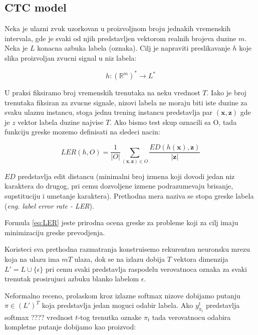 \documentclass[a4paper]{article}
\begin{document}

\subsection{CTC model}

Neka je ulazni zvuk uzorkovan u proizvoljnom broju jednakih vremenskih intervala,  gde je svaki od njih predstavljen vektorom realnih brojeva duzine $m$.  Neka je $L$ konacna azbuka labela (oznaka).  Cilj je napraviti preslikavanje $h$ koje slika proizvoljan zvucni signal u niz labela:

\begin{equation}
\label{eq:pres1}
h: (\mathbb{R}^m)^* \rightarrow L^* 
\end{equation}


U praksi fiksiramo broj vremenskih trenutaka na neku vrednost $T$.  Iako je broj trenutaka fiksiran za zvucne signale,  nizovi labela ne moraju biti iste duzine za svaku ulaznu instancu, stoga jednu trening instancu predstavlja par $(\textbf{x}, \textbf{z})$ gde je $z$ vektor labela duzine najvise $T$.  Ako bismo test skup oznacili sa O, tada funkciju greske mozemo definisati na sledeci nacin:


\begin{equation}
\label{eq:LER}
LER(h, O) = \frac{1}{|O|}\sum_{(\textbf{x}, \textbf{z}) \in O}\frac{ED(h(\textbf{x}), \textbf{z})}{\textbf{|z|}}
\end{equation}


$ED$ predstavlja edit distancu (minimalni broj izmena koji dovodi jedan niz karaktera do drugog, pri cemu dozvoljene izmene podrazumevaju brisanje,  supstituciju i umetanje karaktera).  Prethodna mera naziva se stopa greske labela (\textit{eng.  label error rate - LER}).  


Formula \ref{eq:LER} jeste prirodna ocena greske za probleme koji za cilj imaju minimizaciju greske prevodjenja.

\bigskip
Koristeci sva prethodna razmatranja konstruisemo rekurentnu neuronsku mrezu koja na ulazu ima $mT$ ulaza,  dok se na izlazu dobija $T$ vektora dimenzija $L' = L \cup \{\epsilon\}$ pri cemu svaki predstavlja raspodelu verovatnoca oznaka za svaki trenutak prosirujuci azbuku blanko labelom $\epsilon$.

\bigskip
Neformalno receno,  prolaskom kroz izlazne softmax nizove dobijamo putanju $\pi \in (L')^T$ koja predstavlja jedan moguci odabir labela.  Ako $y_{\pi_t}^t$ predstavlja softmax ???? vrednost $t$-tog trenutka oznake $\pi_t$ tada verovatnocu odabira kompletne putanje dobijamo kao proizvod:
\end{document}
